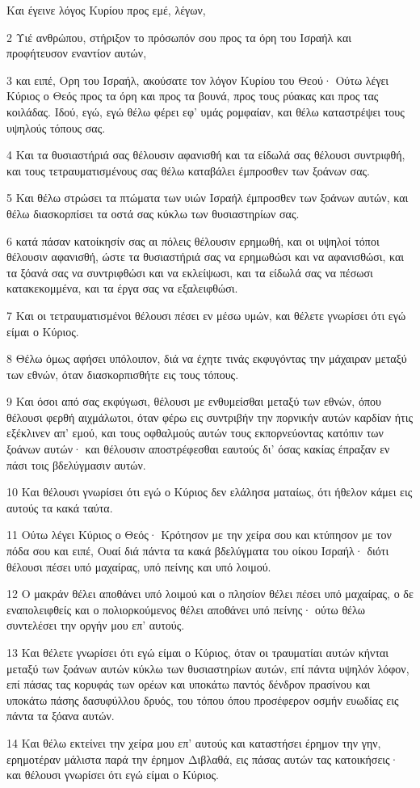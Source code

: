 \par Και έγεινε λόγος Κυρίου προς εμέ, λέγων,
\par 2 Υιέ ανθρώπου, στήριξον το πρόσωπόν σου προς τα όρη του Ισραήλ και προφήτευσον εναντίον αυτών,
\par 3 και ειπέ, Ορη του Ισραήλ, ακούσατε τον λόγον Κυρίου του Θεού· Ούτω λέγει Κύριος ο Θεός προς τα όρη και προς τα βουνά, προς τους ρύακας και προς τας κοιλάδας. Ιδού, εγώ, εγώ θέλω φέρει εφ' υμάς ρομφαίαν, και θέλω καταστρέψει τους υψηλούς τόπους σας.
\par 4 Και τα θυσιαστήριά σας θέλουσιν αφανισθή και τα είδωλά σας θέλουσι συντριφθή, και τους τετραυματισμένους σας θέλω καταβάλει έμπροσθεν των ξοάνων σας.
\par 5 Και θέλω στρώσει τα πτώματα των υιών Ισραήλ έμπροσθεν των ξοάνων αυτών, και θέλω διασκορπίσει τα οστά σας κύκλω των θυσιαστηρίων σας.
\par 6 κατά πάσαν κατοίκησίν σας αι πόλεις θέλουσιν ερημωθή, και οι υψηλοί τόποι θέλουσιν αφανισθή, ώστε τα θυσιαστήριά σας να ερημωθώσι και να αφανισθώσι, και τα ξόανά σας να συντριφθώσι και να εκλείψωσι, και τα είδωλά σας να πέσωσι κατακεκομμένα, και τα έργα σας να εξαλειφθώσι.
\par 7 Και οι τετραυματισμένοι θέλουσι πέσει εν μέσω υμών, και θέλετε γνωρίσει ότι εγώ είμαι ο Κύριος.
\par 8 Θέλω όμως αφήσει υπόλοιπον, διά να έχητε τινάς εκφυγόντας την μάχαιραν μεταξύ των εθνών, όταν διασκορπισθήτε εις τους τόπους.
\par 9 Και όσοι από σας εκφύγωσι, θέλουσι με ενθυμείσθαι μεταξύ των εθνών, όπου θέλουσι φερθή αιχμάλωτοι, όταν φέρω εις συντριβήν την πορνικήν αυτών καρδίαν ήτις εξέκλινεν απ' εμού, και τους οφθαλμούς αυτών τους εκπορνεύοντας κατόπιν των ξοάνων αυτών· και θέλουσιν αποστρέφεσθαι εαυτούς δι' όσας κακίας έπραξαν εν πάσι τοις βδελύγμασιν αυτών.
\par 10 Και θέλουσι γνωρίσει ότι εγώ ο Κύριος δεν ελάλησα ματαίως, ότι ήθελον κάμει εις αυτούς τα κακά ταύτα.
\par 11 Ούτω λέγει Κύριος ο Θεός· Κρότησον με την χείρα σου και κτύπησον με τον πόδα σου και ειπέ, Ουαί διά πάντα τα κακά βδελύγματα του οίκου Ισραήλ· διότι θέλουσι πέσει υπό μαχαίρας, υπό πείνης και υπό λοιμού.
\par 12 Ο μακράν θέλει αποθάνει υπό λοιμού και ο πλησίον θέλει πέσει υπό μαχαίρας, ο δε εναπολειφθείς και ο πολιορκούμενος θέλει αποθάνει υπό πείνης· ούτω θέλω συντελέσει την οργήν μου επ' αυτούς.
\par 13 Και θέλετε γνωρίσει ότι εγώ είμαι ο Κύριος, όταν οι τραυματίαι αυτών κήνται μεταξύ των ξοάνων αυτών κύκλω των θυσιαστηρίων αυτών, επί πάντα υψηλόν λόφον, επί πάσας τας κορυφάς των ορέων και υποκάτω παντός δένδρον πρασίνου και υποκάτω πάσης δασυφύλλου δρυός, του τόπου όπου προσέφερον οσμήν ευωδίας εις πάντα τα ξόανα αυτών.
\par 14 Και θέλω εκτείνει την χείρα μου επ' αυτούς και καταστήσει έρημον την γην, ερημοτέραν μάλιστα παρά την έρημον Διβλαθά, εις πάσας αυτών τας κατοικήσεις· και θέλουσι γνωρίσει ότι εγώ είμαι ο Κύριος.

